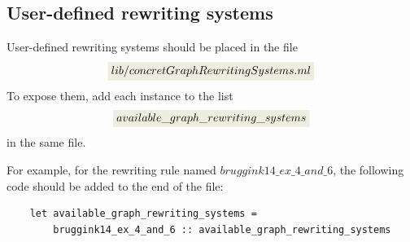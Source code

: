 \subsection{User-defined rewriting systems}
User-defined rewriting systems should be placed in the file 
    $$\colorbox{Ivory2}{$lib/concretGraphRewritingSystems.ml$}$$
 To expose them, add each instance to the list 
 $$\colorbox{Ivory2}{$available\_graph\_rewriting\_systems$}$$ in the same file.

For example, for the rewriting rule named \colorbox{Ivory2}{$bruggink14\_ex\_4\_and\_6$}, the following code should be added to the end of the file:
\begin{lstlisting}
    let available_graph_rewriting_systems = 
        bruggink14_ex_4_and_6 :: available_graph_rewriting_systems 
\end{lstlisting}

